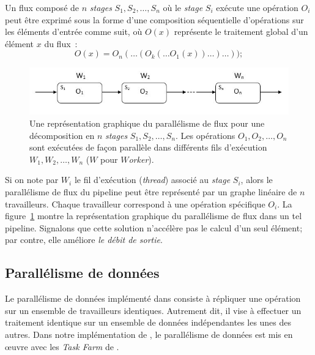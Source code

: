 \goodbreak
\begin{samepage}
Un flux compos\'e de $n$ \emph{stages} $S_1, S_2, \ldots, S_n$ o\`u le \emph{stage} $S_i$ ex\'ecute une op\'eration $O_i$ peut \^etre exprim\'e sous la forme d'une composition s\'equentielle d'op\'erations sur les \'el\'ements d'entr\'ee comme suit, o\`u $O(x)$ repr\'esente le traitement global d'un \'el\'ement $x$ du flux~: 
%
\[
	O(x) = O_n( \ldots (O_k( \ldots O_1(x)) \ldots ) \ldots ));
\]
\end{samepage}


\begin{figure}
\centering
     \includegraphics[width=1.0\textwidth]{Figures/ParallelismeDuFlux.jpg}
      \caption[Une repr\'esentation graphique du parall\'elisme de flux en \ppff.]{Une repr\'esentation graphique du parall\'elisme de flux pour une d\'ecomposition en $n$ \emph{stages} $S_1, S_2, \ldots, S_n$. Les op\'erations $O_1, O_2, \ldots, O_n$ sont ex\'ecut\'ees de fa\c{c}on parall\`ele dans diff\'erents fils d'ex\'ecution $W_1, W_2, \ldots, W_n$ ($W$ pour \emph{$W$orker}).}
       \label{ParallelismeDuFlux.fig}
\end{figure}


Si on note par $W_i$ le fil d'ex\'ecution (\emph{thread}) associ\'e au \emph{stage} $S_i$, alors
le parall\'elisme de flux du pipeline peut \^etre repr\'esent\'e par un graphe lin\'eaire de $n$ travailleurs. Chaque travailleur correspond \`a une op\'eration sp\'ecifique $O_i$. La figure~\ref{ParallelismeDuFlux.fig} montre la repr\'esentation graphique du parall\'elisme de flux dans un tel pipeline. Signalons que cette solution n'acc\'el\`ere pas le calcul d'un seul \'el\'ement; par contre, elle am\'eliore \emph{le d\'ebit de sortie}.

\subsection{Parall\'elisme de donn\'ees}

Le parall\'elisme de donn\'ees impl\'ement\'e dans   consiste \`a r\'epliquer une op\'eration sur un ensemble de travailleurs identiques. Autrement dit, il vise \`a effectuer un traitement identique sur un ensemble de donn\'ees ind\'ependantes les unes des autres. 
%
Dans notre impl\'ementation de \PpFf, le parall\'elisme de donn\'ees est mis en \oe{}uvre avec les \emph{Task Farm} de .


